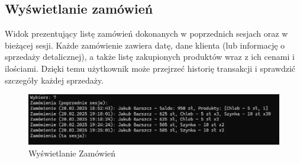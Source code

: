 \subsection{Wyświetlanie zamówień}
Widok prezentujący listę zamówień dokonanych w poprzednich sesjach oraz w bieżącej sesji. Każde zamówienie zawiera datę, dane klienta (lub informację o sprzedaży detalicznej), a także listę zakupionych produktów wraz z ich cenami i ilościami. Dzięki temu użytkownik może przejrzeć historię transakcji i sprawdzić szczegóły każdej sprzedaży.
\begin{figure}[ht]
    \centering
    \includegraphics[width=0.9\linewidth]{figures/Zamowienia.png}
    \caption{Wyświetlanie Zamówień}
\end{figure}


